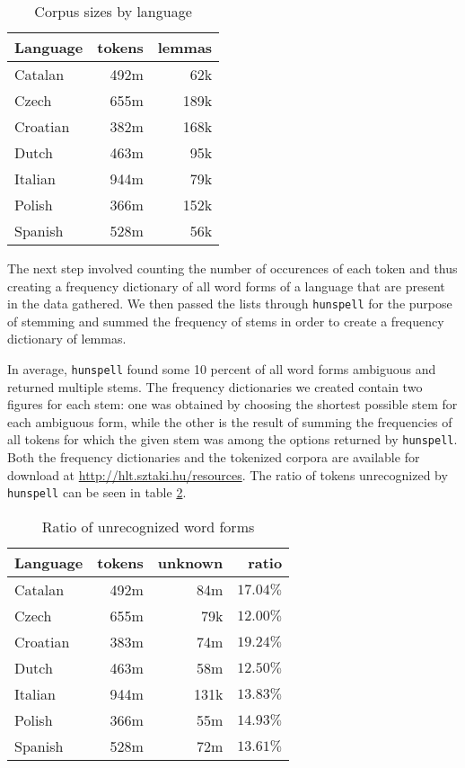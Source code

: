 \documentclass[10pt, a4paper]{article}
\begin{document}

\begin{table}
\centering
\begin{tabular}{|l|r|r|}
\hline
Language & tokens & lemmas\\
\hline
Catalan & 492m & 62k\\
Czech & 655m & 189k\\
Croatian & 382m & 168k\\
Dutch & 463m & 95k\\
Italian & 944m & 79k\\
Polish & 366m & 152k\\
Spanish & 528m & 56k\\
\hline
\end{tabular}
\caption{Corpus sizes by language}
\label{table:size}
\end{table}

The next step involved counting the number of occurences of each token and
thus creating a frequency dictionary of all word forms of a language that are
present in the data gathered. We then passed the lists through
\texttt{hunspell} for the purpose of stemming and summed the frequency of
stems in order to create a frequency dictionary of lemmas.

In average, \texttt{hunspell} found some 10 percent of all word forms
ambiguous and returned multiple stems. The frequency dictionaries we created
contain two figures for each stem: one was obtained by choosing the shortest
possible stem for each ambiguous form, while the other is the result of
summing the frequencies of all tokens for which the given stem was among the
options returned by \texttt{hunspell}. Both the frequency dictionaries and the
tokenized corpora are available for download at
\href{http://hlt.sztaki.hu/resources}{http://hlt.sztaki.hu/resources}. The
ratio of tokens unrecognized by \texttt{hunspell} can be seen in table
\ref{table:recognized}.

\begin{table}
\centering
\begin{tabular}{|l|r|r|r|}
\hline
Language & tokens & unknown & ratio\\
\hline
Catalan & 492m & 84m & $17.04\%$\\
Czech & 655m & 79k & $12.00\%$ \\
Croatian & 383m & 74m & $19.24\%$\\
Dutch & 463m & 58m & $12.50\%$\\
Italian & 944m & 131k & $13.83\%$\\
Polish & 366m & 55m & $14.93\%$\\
Spanish & 528m & 72m & $13.61\%$\\
\hline
\end{tabular}
\caption{Ratio of unrecognized word forms}
\label{table:recognized}
\end{table}
\end{document}
